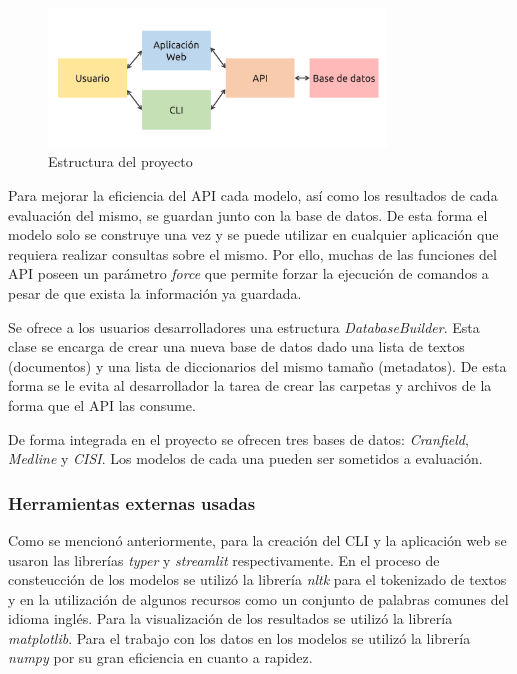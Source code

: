 \begin{figure}[htb]%
	\begin{center}
		\includegraphics[width=0.8\textwidth]{./sri_03.png}
	\end{center}
	\caption{Estructura del proyecto}
	\label{fig:project-structure}
\end{figure}

Para mejorar la eficiencia del API cada modelo, así como los resultados de cada
evaluación del mismo, se guardan junto con la base de datos. De esta forma el 
modelo solo se construye una vez y se puede utilizar en cualquier aplicación
que requiera realizar consultas sobre el mismo. Por ello, muchas de las funciones
del API poseen un parámetro \emph{force} que permite forzar la ejecución de
comandos a pesar de que exista la información ya guardada.

Se ofrece a los usuarios desarrolladores una estructura \emph{DatabaseBuilder}.
Esta clase se encarga de crear una nueva base de datos dado una lista de textos
(documentos) y una lista de diccionarios del mismo tamaño (metadatos). De
esta forma se le evita al desarrollador la tarea de crear las carpetas y archivos
de la forma que el API las consume.

De forma integrada en el proyecto se ofrecen tres bases de datos: \emph{Cranfield},
\emph{Medline} y \emph{CISI}. Los modelos de cada una pueden ser sometidos a 
evaluación.

\subsubsection{Herramientas externas usadas}\label{sec:external-tools}

Como se mencionó anteriormente, para la creación del CLI y la aplicación web se
usaron las librerías \emph{typer} y \emph{streamlit} respectivamente. En el
proceso de consteucción de los modelos se utilizó la librería \emph{nltk} para
el tokenizado de textos y en la utilización de algunos recursos como un
conjunto de palabras comunes del idioma inglés. Para la visualización de los
resultados se utilizó la librería \emph{matplotlib}. Para el trabajo con los datos
en los modelos se utilizó la librería \emph{numpy} por su gran eficiencia en cuanto
a rapidez.
